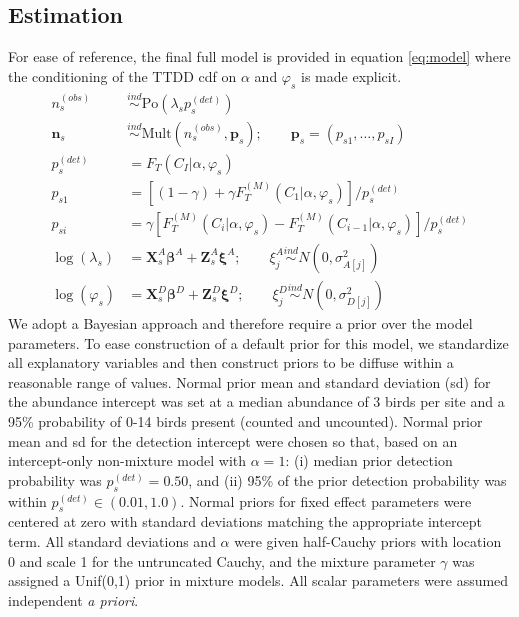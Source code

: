 \documentclass[12pt]{article}
\newcommand{\vn}{\textbf{n}}
\newcommand{\vp}{\textbf{p}}
\newcommand{\vX}{\textbf{X}}
\newcommand{\vZ}{\textbf{Z}}
\newcommand{\vbeta}{\boldsymbol{\beta}}
\newcommand{\vxi}{\boldsymbol{\xi}}
\newcommand{\Po}{\mbox{Po}}
\newcommand{\Mult}{\mbox{Mult}}
\newcommand{\pdet}{p^{(det)}}
\newcommand{\ind}{\stackrel{ind}{\sim}}
\newcommand{\Fm}{F_T^{(M)}}
\begin{document}
\subsection{Estimation}

For ease of reference, the final full model is provided in equation \eqref{eq:model} where the conditioning of the TTDD cdf on $\alpha$ and $\varphi_s$ is made explicit.
\begin{align}
n_s^{(obs)} &\ind \Po(\lambda_s \pdet_s) \nonumber\\
\vn_s &\ind \Mult(n_s^{(obs)}, \vp_s); \qquad \vp_s = (p_{s1},\dots,p_{sI}) \nonumber\\
\pdet_s &= F_T(C_I|\alpha,\varphi_s) \nonumber \\
p_{s1} &= \left[(1-\gamma) + \gamma\Fm(C_1|\alpha,\varphi_s)\right]/\pdet_s \label{eq:model} \\
p_{si} &= \gamma\left[\Fm(C_i|\alpha,\varphi_s) - \Fm(C_{i-1}|\alpha,\varphi_s)\right]/\pdet_s \nonumber\\
\log(\lambda_s) &= \vX_{s}^A\vbeta^A + \vZ_{s}^A\vxi^A; \qquad \xi_j^A \ind N(0,\sigma_{A[j]}^2) \nonumber\\
\log(\varphi_{s}) &= \vX_{s}^D\vbeta^D + \vZ_{s}^D\vxi^D; \qquad \xi_j^D \ind N(0,\sigma_{D[j]}^2) \nonumber
\end{align}
We adopt a Bayesian approach and therefore require a prior over the model parameters.
To ease construction of a default prior for this model, we standardize all explanatory variables and then construct priors to be diffuse within a reasonable range of values.
Normal prior mean and standard deviation (sd) for the abundance intercept was set at a median abundance of 3 birds per site and a 95\% probability of 0-14 birds present (counted and uncounted).  
Normal prior mean and sd for the detection intercept were chosen so that, based on an intercept-only non-mixture model with $\alpha=1$: (i) median prior detection probability was $p_{s}^{(det)} = 0.50$, and (ii) 95\% of the prior detection probability was within $p_{s}^{(det)} \in (0.01, 1.0)$.  
Normal priors for fixed effect parameters were centered at zero with standard deviations matching the appropriate intercept term.  
All standard deviations and $\alpha$ were given half-Cauchy priors with location 0 and scale 1 for the untruncated Cauchy, and the mixture parameter $\gamma$ was assigned a Unif(0,1) prior in mixture models.
All scalar parameters were assumed independent \emph{a priori}. 
\end{document}
